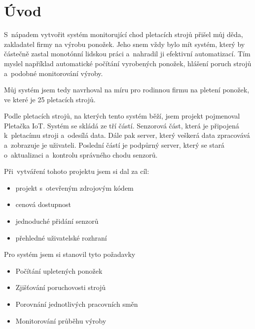 \chapter*{Úvod}

S~nápadem vytvořit systém monitorující chod pletacích strojů přišel můj děda, zakladatel firmy na výrobu ponožek.
Jeho snem vždy bylo mít systém, který by částečně zastal monotónní lidskou práci a~nahradil ji efektivní automatizací.
Tím myslel například automatické počítání vyrobených ponožek, hlášení poruch strojů a~podobné monitorování výroby.

Můj systém jsem tedy navrhoval na míru pro rodinnou firmu na pletení ponožek, ve které je 25 pletacích strojů. 

Podle pletacích strojů, na kterých tento systém běží, jsem projekt pojmenoval Pletačka IoT. 
Systém se skládá ze tří částí. Senzorová část, která je připojená k~pletacímu stroji a~odesílá data.
Dále pak server, který veškerá data zpracovává a~zobrazuje je uživateli.
Poslední částí je podpůrný server, který se stará o~aktualizaci a~kontrolu správného chodu senzorů.\newline


Při~vytváření tohoto projektu jsem si dal za cíl:
\begin{itemize}
    \item projekt s~otevřeným zdrojovým kódem
    \item cenová dostupnost
    \item jednoduché přidání senzorů
    \item přehledné uživatelské rozhraní
\end{itemize}

\newpage
Pro systém jsem si stanovil tyto požadavky
\begin{itemize}
    \item Počítání upletených ponožek
    \item Zjišťování poruchovosti strojů
    \item Porovnání jednotlivých pracovních směn
    \item Monitorování průběhu výroby
\end{itemize}

